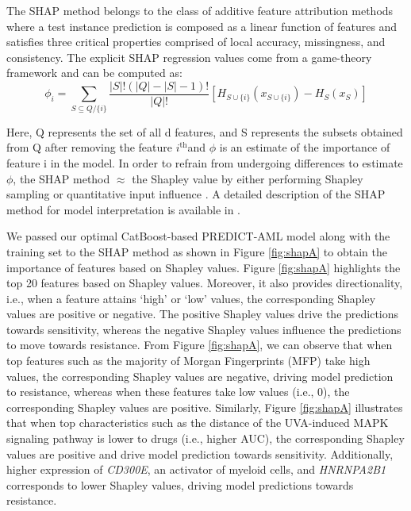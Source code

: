 \documentclass[pdflatex,sn-mathphys-num]{sn-jnl}%
\theoremstyle{thmstyleone}%
\theoremstyle{thmstyletwo}%
\theoremstyle{thmstylethree}%
\begin{document}
The SHAP method belongs to the class of additive feature attribution methods where a test instance prediction is composed as a linear function of features and satisfies three critical properties comprised of local accuracy, missingness, and consistency. The explicit SHAP regression values come from a game-theory framework \cite{lipovetsky2001analysis,shapley1953stochastic} and can be computed as:
\begin{equation}
    \phi_{i} = \sum_{S \subseteq Q/\{i\}}\frac{|S|!(|Q|-|S|-1)!}{|Q|!} [H_{S\cup{\{i\}}}(x_{S \cup \{i\}}) - H_{S}(x_{S})]
\end{equation}

Here, Q represents the set of all d features, and S represents the subsets obtained from Q after removing the feature $i^{\text{th}}$and $\phi$ is an estimate of the importance of feature i in the model. 
In order to refrain from undergoing differences to estimate $\phi$, the SHAP method $\approx$ the Shapley value by either performing Shapley sampling \cite{strumbelj2010efficient} or quantitative input influence \cite{datta2016algorithmic}. A detailed description of the SHAP method for model interpretation is available in \cite{lundberg2017unified}.

We passed our optimal CatBoost-based PREDICT-AML model along with the training set to the SHAP method as shown in Figure \ref{fig:shapA} to obtain the importance of features based on Shapley values. Figure \ref{fig:shapA} highlights the top 20 features based on Shapley values. Moreover, it also provides directionality, i.e., when a feature attains ‘high’ or ‘low’ values, the corresponding Shapley values are positive or negative. The positive Shapley values drive the predictions towards sensitivity, whereas the negative Shapley values influence the predictions to move towards resistance. From Figure \ref{fig:shapA}, we can observe that when top features such as the majority of Morgan Fingerprints (MFP) take high values, the corresponding Shapley values are negative, driving model prediction to resistance, whereas when these features take low values (i.e., 0), the corresponding Shapley values are positive. Similarly, Figure \ref{fig:shapA} illustrates that when top characteristics such as the distance of the UVA-induced MAPK signaling pathway is lower to drugs (i.e., higher AUC), the corresponding Shapley values are positive and drive model prediction towards sensitivity. Additionally, higher expression of \textit{CD300E}, an activator of myeloid cells, and \textit{HNRNPA2B1} corresponds to lower Shapley values, driving model predictions towards resistance.
\end{document}
